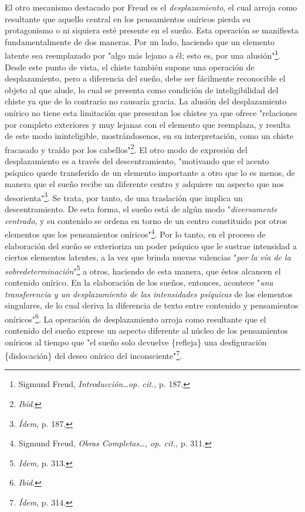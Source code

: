 \documentclass{book}
\begin{document}
El otro mecanismo destacado por Freud es el \emph{desplazamiento}, el
cual arroja como resultante que aquello central en los pensamientos
oníricos pierda su protagonismo o ni siquiera esté presente en el sueño.
Esta operación se manifiesta fundamentalmente de dos maneras. Por un
lado, haciendo que un elemento latente sea reemplazado por "algo más
lejano a él; esto es, por una alusión"\footnote{Sigmund Freud,
  \emph{Introducción\ldots op. cit.,} p. 187.}. Desde este punto de
vista, el chiste también supone una operación de desplazamiento, pero a
diferencia del sueño, debe ser fácilmente reconocible el objeto al que
alude, lo cual se presenta como condición de inteligibilidad del chiste
ya que de lo contrario no causaría gracia. La alusión del desplazamiento
onírico no tiene esta limitación que presentan los chistes ya que ofrece
"relaciones por completo exteriores y muy lejanas con el elemento que
reemplaza, y resulta de este modo ininteligible, mostrándosenos, en su
interpretación, como un chiste fracasado y traído por los
cabellos"\footnote{\emph{Ibíd}.}. El otro modo de expresión del
desplazamiento es a través del descentramiento, "motivando que el acento
psíquico quede transferido de un elemento importante a otro que lo es
menos, de manera que el sueño recibe un diferente centro y adquiere un
aspecto que nos desorienta"\footnote{\emph{Ídem}, p. 187.}. Se trata,
por tanto, de una traslación que implica un descentramiento. De esta
forma, el sueño está de algún modo "\emph{diversamente centrado}, y su
contenido se ordena en torno de un centro constituido por otros
elementos que los pensamientos oníricos"\footnote{Sigmund Freud,
  \emph{Obras Completas\ldots, op. cit.}, p. 311.}. Por lo tanto, en el
proceso de elaboración del sueño se exterioriza un poder psíquico que le
sustrae intensidad a ciertos elementos latentes, a la vez que brinda
nuevas valencias "\emph{por la vía de la sobredeterminación}"\footnote{\emph{Idem},
  p. 313.} a otros, haciendo de esta manera, que éstos alcancen el
contenido onírico. En la elaboración de los sueños, entonces, acontece
"\emph{una transferencia y un desplazamiento de las intensidades
psíquicas} de los elementos singulares, de lo cual deriva la diferencia
de texto entre contenido y pensamientos oníricos"\footnote{\emph{Ibid}.}.
La operación de desplazamiento arroja como resultante que el contenido
del sueño exprese un aspecto diferente al núcleo de los pensamientos
oníricos al tiempo que "el sueño solo devuelve \{refleja\} una
desfiguración \{dislocación\} del deseo onírico del
inconsciente"\footnote{\emph{Ídem}, p. 314.}.
\end{document}
